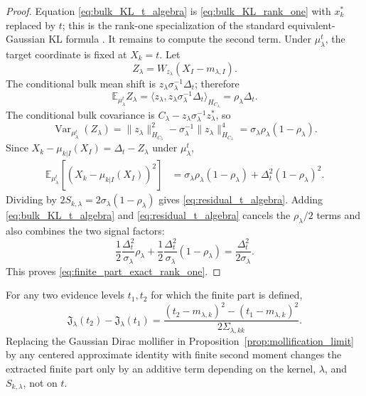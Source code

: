 \begin{proof}
Equation \eqref{eq:bulk_KL_t_algebra} is
\eqref{eq:bulk_KL_rank_one} with $x_k^*$ replaced by $t$; this is the rank-one specialization of the standard equivalent-Gaussian KL formula \cite{bogachev1998gaussian,quang2022kl}.
It remains to compute the second term.  Under $\mu_\lambda^t$, the target
coordinate is fixed at $X_k=t$.  Let
\[
  Z_\lambda=W_{z_\lambda}(X_I-m_{\lambda,I}).
\]
The conditional bulk mean shift is $z_\lambda\sigma_\lambda^{-1}\Delta_t$;
therefore
\[
  \mathbb{E}_{\mu_\lambda^t}Z_\lambda
  =\langle z_\lambda,z_\lambda\sigma_\lambda^{-1}\Delta_t
    \rangle_{H_{C_\lambda}}
  =\rho_\lambda\Delta_t.
\]
The conditional bulk covariance is
$C_\lambda-z_\lambda\sigma_\lambda^{-1}z_\lambda^*$, so
\[
  \operatorname{Var}_{\mu_\lambda^t}(Z_\lambda)
  =\|z_\lambda\|_{H_{C_\lambda}}^2
   -\sigma_\lambda^{-1}\|z_\lambda\|_{H_{C_\lambda}}^4
  =\sigma_\lambda\rho_\lambda(1-\rho_\lambda).
\]
Since
$X_k-\mu_{k|I}(X_I)=\Delta_t-Z_\lambda$ under $\mu_\lambda^t$,
\begin{align*}
  \mathbb{E}_{\mu_\lambda^t}
  \left[(X_k-\mu_{k|I}(X_I))^2\right]
  &=\sigma_\lambda\rho_\lambda(1-\rho_\lambda)
    +\Delta_t^2(1-\rho_\lambda)^2.
\end{align*}
Dividing by
$2S_{k,\lambda}=2\sigma_\lambda(1-\rho_\lambda)$ gives
\eqref{eq:residual_t_algebra}.  Adding
\eqref{eq:bulk_KL_t_algebra} and \eqref{eq:residual_t_algebra} cancels the
$\rho_\lambda/2$ terms and also combines the two signal factors:
\[
  \frac12\frac{\Delta_t^2}{\sigma_\lambda}\rho_\lambda
  +\frac12\frac{\Delta_t^2}{\sigma_\lambda}(1-\rho_\lambda)
  =\frac{\Delta_t^2}{2\sigma_\lambda}.
\]
This proves \eqref{eq:finite_part_exact_rank_one}.
\end{proof}

\begin{lemma}
\label{lem:weak_scheme_independence}
For any two evidence levels $t_1,t_2$ for which the finite part is defined,
\begin{equation}
    \mathfrak{J}_\lambda(t_2)-\mathfrak{J}_\lambda(t_1)
    =
    \frac{(t_2-m_{\lambda,k})^2-(t_1-m_{\lambda,k})^2}
    {2\Sigma_{\lambda,kk}}.
    \label{eq:weak_scheme_independence_app}
\end{equation}
Replacing the Gaussian Dirac mollifier in Proposition~\ref{prop:mollification_limit} by
any centered approximate identity with finite second moment changes the extracted
finite part only by an additive term depending on the kernel, $\lambda$, and
$S_{k,\lambda}$, not on $t$.
\end{lemma}

